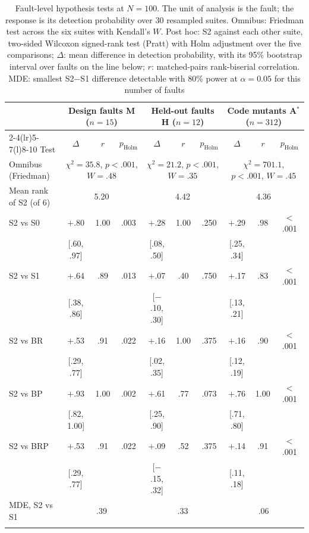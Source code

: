 \begin{table}[!t]
\caption{Fault-level hypothesis tests at $N=100$. The unit of analysis is the fault; the response is its detection probability over 30 resampled suites. Omnibus: Friedman test across the six suites with Kendall's $W$. Post hoc: S2 against each other suite, two-sided Wilcoxon signed-rank test (Pratt) with Holm adjustment over the five comparisons; $\Delta$: mean difference in detection probability, with its 95\% bootstrap interval over faults on the line below; $r$: matched-pairs rank-biserial correlation. MDE: smallest S2$-$S1 difference detectable with 80\% power at $\alpha=0.05$ for this number of faults}
\label{tab:stats}
\footnotesize
\setlength{\tabcolsep}{3pt}
\begin{tabular}{@{}lccccccccc@{}}
\toprule
 & \multicolumn{3}{c}{Design faults M ($n=15$)} & \multicolumn{3}{c}{Held-out faults H ($n=12$)} & \multicolumn{3}{c}{Code mutants A$^{*}$ ($n=312$)} \\
\cmidrule(lr){2-4}\cmidrule(lr){5-7}\cmidrule(l){8-10}
Test & $\Delta$ & $r$ & $p_{\mathrm{Holm}}$ & $\Delta$ & $r$ & $p_{\mathrm{Holm}}$ & $\Delta$ & $r$ & $p_{\mathrm{Holm}}$ \\
\midrule
Omnibus (Friedman) & \multicolumn{3}{c}{$\chi^2=35.8$, $p<.001$, $W=.48$} & \multicolumn{3}{c}{$\chi^2=21.2$, $p<.001$, $W=.35$} & \multicolumn{3}{c}{$\chi^2=701.1$, $p<.001$, $W=.45$} \\
Mean rank of S2 (of 6) & \multicolumn{3}{c}{5.20} & \multicolumn{3}{c}{4.42} & \multicolumn{3}{c}{4.36} \\
\midrule
S2 vs S0 & $+$.80 & 1.00 & .003 & $+$.28 & 1.00 & .250 & $+$.29 & .98 & $<$.001 \\
 & {\scriptsize[.60, .97]} & & & {\scriptsize[.08, .50]} & & & {\scriptsize[.25, .34]} & & \\
S2 vs S1 & $+$.64 & .89 & .013 & $+$.07 & .40 & .750 & $+$.17 & .83 & $<$.001 \\
 & {\scriptsize[.38, .86]} & & & {\scriptsize[$-$.10, .30]} & & & {\scriptsize[.13, .21]} & & \\
S2 vs BR & $+$.53 & .91 & .022 & $+$.16 & 1.00 & .375 & $+$.16 & .90 & $<$.001 \\
 & {\scriptsize[.29, .77]} & & & {\scriptsize[.02, .35]} & & & {\scriptsize[.12, .19]} & & \\
S2 vs BP & $+$.93 & 1.00 & .002 & $+$.61 & .77 & .073 & $+$.76 & 1.00 & $<$.001 \\
 & {\scriptsize[.82, 1.00]} & & & {\scriptsize[.25, .90]} & & & {\scriptsize[.71, .80]} & & \\
S2 vs BRP & $+$.53 & .91 & .022 & $+$.09 & .52 & .375 & $+$.14 & .91 & $<$.001 \\
 & {\scriptsize[.29, .77]} & & & {\scriptsize[$-$.15, .32]} & & & {\scriptsize[.11, .18]} & & \\
\midrule
MDE, S2 vs S1 & \multicolumn{3}{c}{.39} & \multicolumn{3}{c}{.33} & \multicolumn{3}{c}{.06} \\
\botrule
\end{tabular}
\end{table}

